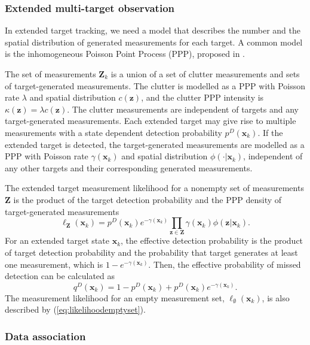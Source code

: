 \documentclass[journal]{IEEEtran}
\begin{document}
\subsubsection{Extended multi-target observation}
In extended target tracking, we need a model that describes the number and the spatial distribution of generated measurements for each target. A common model is the inhomogeneous Poisson Point Process (PPP), proposed in \cite{ppp}. 

The set of measurements $\mathbf{Z}_k$ is a union of a set of clutter measurements and sets of target-generated measurements. The clutter is modelled as a PPP with Poisson rate $\lambda$ and spatial distribution $c(\mathbf{z})$, and the clutter PPP intensity is $\kappa(\mathbf{z})  = \lambda c(\mathbf{z})$. The clutter measurements are independent of targets and any target-generated measurements. Each extended target may give rise to multiple measurements with a state dependent detection probability $p^D(\mathbf{x}_k)$. If the extended target is detected, the target-generated measurements are modelled as a PPP with Poisson rate $\gamma(\mathbf{x}_k)$ and spatial distribution $\phi(\cdot|\mathbf{x}_k)$, independent of any other targets and their corresponding generated measurements.

The extended target measurement likelihood for a nonempty set of measurements $\mathbf{Z}$ is the product of the target detection probability and the PPP density of target-generated measurements \cite{pmbmextended2}
\begin{equation}
    \ell_{\mathbf{Z}}(\mathbf{x}_k) = p^D(\mathbf{x}_k)e^{-\gamma(\mathbf{x}_k)}\prod_{\mathbf{z}\in \mathbf{Z}}\gamma(\mathbf{x}_k)\phi(\mathbf{z}|\mathbf{x}_k).
    \label{eq:extendedlikelihood}
\end{equation}
For an extended target state $\mathbf{x}_k$, the effective detection probability is the product of target detection probability and the probability that target generates at least one measurement, which is $1-e^{-\gamma(\mathbf{x}_k)}$. Then, the effective probability of missed detection can be calculated as
\begin{equation}
    q^D(\mathbf{x}_k) = 1 - p^D(\mathbf{x}_k) + p^D(\mathbf{x}_k)e^{-\gamma(\mathbf{x}_k)}.
    \label{eq:likelihoodemptyset}
\end{equation}
The measurement likelihood for an empty measurement set, $\ell_{\emptyset}(\mathbf{x}_k)$, is also described by (\ref{eq:likelihoodemptyset}).

\subsubsection{Data association}
\end{document}
